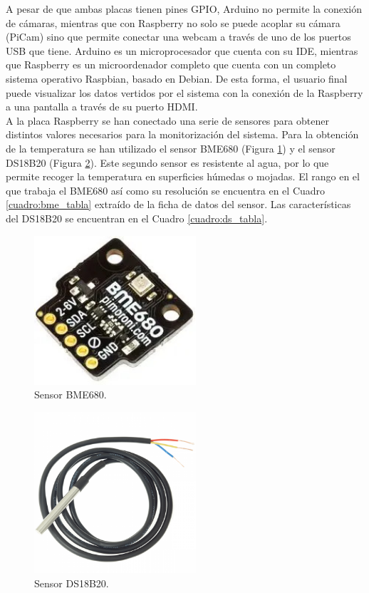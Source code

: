 A pesar de que ambas placas tienen pines GPIO, Arduino no permite la conexión de cámaras, mientras que con Raspberry no solo se puede acoplar su cámara (PiCam) sino que permite conectar una webcam a través de uno de los puertos USB que tiene. Arduino es un microprocesador que cuenta con su IDE, mientras que Raspberry es un microordenador completo que cuenta con un completo sistema operativo Raspbian, basado en Debian. De esta forma, el usuario final puede visualizar los datos vertidos por el sistema con la conexión de la Raspberry a una pantalla a través de su puerto HDMI.\\

A la placa Raspberry se han conectado una serie de sensores para obtener distintos valores necesarios para la monitorización del sistema. Para la obtención de la temperatura se han utilizado el sensor BME680 (Figura \ref{fig:bme_of}) y el sensor DS18B20 (Figura \ref{fig:ds_of}). Este segundo sensor es resistente al agua, por lo que permite recoger la temperatura en superficies húmedas o mojadas. El rango en el que trabaja el BME680 así como su resolución se encuentra en el Cuadro \ref{cuadro:bme_tabla} extraído de la ficha de datos del sensor. Las características del DS18B20 se encuentran en el Cuadro \ref{cuadro:ds_tabla}.\\
\begin{figure} [h!]
  \begin{center}
    \includegraphics[width=6cm]{figs/bme_of}
  \end{center}
  \caption{Sensor BME680.}
  \label{fig:bme_of}
\end{figure}

\begin{figure} [h!]
  \begin{center}
    \includegraphics[width=6cm]{figs/ds_of}
  \end{center}
  \caption{Sensor DS18B20.}
  \label{fig:ds_of}
\end{figure}

